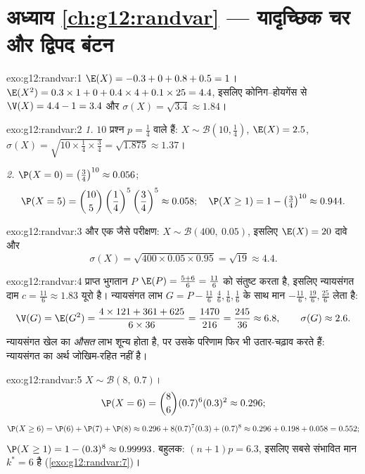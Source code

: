 \section*{अध्याय \ref{ch:g12:randvar} --- यादृच्छिक चर और द्विपद बंटन}

\begin{solution}{exo:g12:randvar:1}
$\E(X) = -0.3 + 0 + 0.8 + 0.5 = 1$। $\E(X^2) = 0.3 \times 1 + 0 + 0.4\times4 + 0.1\times25 = 4.4$, इसलिए कोनिग--होयगेंस से $\V(X) = 4.4 - 1 = 3.4$ और $\sigma(X) = \sqrt{3.4} \approx 1.84$।
\end{solution}

\begin{solution}{exo:g12:randvar:2}
\emph{1.} $10$ प्रश्न $p = \frac14$ वाले   हैं: $X \sim \mathcal B\left(10, \frac14\right)$, $\E(X) = 2.5$, $\sigma(X) = \sqrt{10 \times \frac14 \times \frac34} = \sqrt{1.875}
\approx 1.37$।

\emph{2.} $\P(X = 0) = \left(\frac34\right)^{10} \approx 0.056$;
\[
\P(X = 5) = \binom{10}{5}\left(\frac14\right)^5\left(\frac34\right)^5
\approx 0.058;
\quad
\P(X \geq 1) = 1 - \left(\tfrac34\right)^{10} \approx 0.944 .
\]
\end{solution}

\begin{solution}{exo:g12:randvar:3}
 और एक जैसे परीक्षण: $X \sim \mathcal B(400,\ 0.05)$, इसलिए $\E(X) = 20$ दावे और
\[
\sigma(X) = \sqrt{400 \times 0.05 \times 0.95} = \sqrt{19} \approx 4.4 .
\]
\end{solution}

\begin{solution}{exo:g12:randvar:4}
प्राप्त भुगतान $P$ $\E(P) = \frac{5 + 6}{6} = \frac{11}{6}$ को संतुष्ट करता है, इसलिए न्यायसंगत दाम $c = \frac{11}{6} \approx 1.83$ यूरो
है। न्यायसंगत लाभ $G = P - \frac{11}6$  $\frac46, \frac16, \frac16$ के साथ मान $-\frac{11}{6}, \frac{19}{6}, \frac{25}{6}$ लेता है:
\[
\V(G) = \E(G^2)
= \frac{4 \times 121 + 361 + 625}{6 \times 36} = \frac{1470}{216}
= \frac{245}{36} \approx 6.8,
\qquad \sigma(G) \approx 2.6 .
\]
न्यायसंगत खेल का \emph{औसत} लाभ शून्य होता है, पर उसके परिणाम फिर भी
उतार-चढ़ाव करते हैं: न्यायसंगत का अर्थ जोखिम-रहित नहीं है।
\end{solution}

\begin{solution}{exo:g12:randvar:5}
$X \sim \mathcal B(8,\ 0.7)$।
\[
\P(X = 6) = \binom86 (0.7)^6(0.3)^2 \approx 0.296 ;
\]
\[
\P(X \geq 6) = \P(6) + \P(7) + \P(8)
\approx 0.296 + 8(0.7)^7(0.3) + (0.7)^8
\approx 0.296 + 0.198 + 0.058 = 0.552 ;
\]
$\P(X \geq 1) = 1 - (0.3)^8 \approx 0.99993$. बहुलक: $(n+1)p = 6.3$, इसलिए सबसे संभावित मान $k^* = 6$ है (\cref{exo:g12:randvar:7})।
\end{solution}


